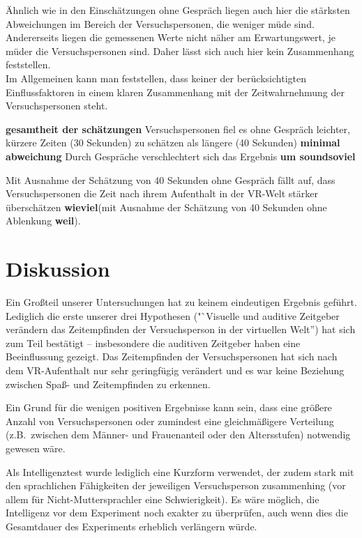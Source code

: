 \documentclass{Paper}
\begin{document}
Ähnlich wie in den Einschätzungen ohne Gespräch liegen auch hier die stärksten Abweichungen im Bereich der Versuchspersonen, die weniger müde sind. Andererseits liegen die gemessenen Werte nicht näher am Erwartungswert, je müder die Versuchspersonen sind. Daher lässt sich auch hier kein Zusammenhang feststellen.\\
Im Allgemeinen kann man feststellen, dass keiner der berücksichtigten Einflussfaktoren in einem klaren Zusammenhang mit der Zeitwahrnehmung der Versuchspersonen steht.




\textbf{gesamtheit der schätzungen}
Versuchspersonen fiel es ohne Gespräch leichter, kürzere Zeiten (30 Sekunden) zu schätzen als längere (40 Sekunden) \textbf{minimal abweichung} Durch Gespräche verschlechtert sich das Ergebnis \textbf{um soundsoviel}



%

Mit Ausnahme der Schätzung von 40 Sekunden ohne Gespräch fällt auf, dass Versuchspersonen die Zeit nach ihrem Aufenthalt in der VR-Welt stärker überschätzen \textbf{wieviel}(mit Ausnahme der Schätzung von 40 Sekunden ohne Ablenkung \textbf{weil}). 



       



\section{Diskussion}

Ein Großteil unserer Untersuchungen hat zu keinem eindeutigen Ergebnis geführt. Lediglich die erste unserer drei Hypothesen ("`Visuelle und auditive Zeitgeber verändern das Zeitempfinden der Versuchsperson in der virtuellen Welt'') hat sich zum Teil bestätigt -- insbesondere die auditiven Zeitgeber haben eine Beeinflussung gezeigt. Das Zeitempfinden der Versuchspersonen hat sich nach dem VR-Aufenthalt nur sehr geringfügig verändert und es war keine Beziehung zwischen Spaß- und Zeitempfinden zu erkennen.
 
Ein Grund für die wenigen positiven Ergebnisse kann sein, dass eine größere Anzahl von Versuchspersonen oder zumindest eine gleichmäßigere Verteilung (z.B.\ zwischen dem Männer- und Frauenanteil oder den Altersstufen) notwendig gewesen wäre.

Als Intelligenztest wurde lediglich eine Kurzform verwendet, der zudem stark mit den sprachlichen Fähigkeiten der jeweiligen Versuchsperson zusammenhing (vor allem für Nicht-Muttersprachler eine Schwierigkeit). Es wäre möglich, die Intelligenz vor dem Experiment noch exakter zu überprüfen, auch wenn dies die Gesamtdauer des Experiments erheblich verlängern würde.
\end{document}
